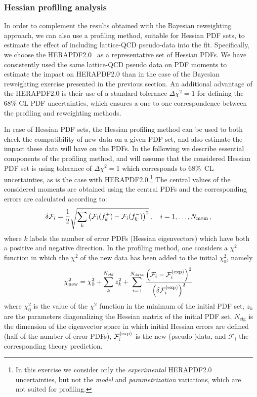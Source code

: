 \subsubsection{Hessian profiling analysis}
\label{sec:hessianprofiling}

In order to complement the results obtained
with the Bayesian reweighting approach,
we can also use a profiling method, suitable
for Hessian PDF sets, to estimate the effect of including
lattice-QCD pseudo-data into the fit. 
%
Specifically, we
choose the HERAPDF2.0~\cite{Abramowicz:2015mha}
as a representative set of Hessian PDFs.
%
We have consistently used the same lattice-QCD
pseudo data on PDF moments to estimate the impact
on HERAPDF2.0 than in the case of the Bayesian reweighting
exercise presented in the previous section.
%
An additional advantage of the HERAPDF2.0 is
their use
of a standard tolerance
$\Delta\chi^2=1$ for defining the 68\% CL PDF
uncertainties, which ensures a
one to one correspondence between
the profiling and reweighting methods.

In case of Hessian PDF sets, the Hessian profiling method
can be used to both check the compatibility of new data on a given PDF set,
and also  estimate the impact these data will have on the PDFs. 
In the following we describe essential components of the profiling method, 
and will assume  that the considered Hessian PDF set is using tolerance of $\Delta\chi^2=1$ 
which corresponds to 68\%~CL uncertainties,
as is the case with HERAPDF2.0.\footnote{In this exercise
we consider only the {\it experimental} HERAPDF2.0
uncertainties, but not the {\it model} and {\it parametrization}
variations, which are not suited for profiling.}
%
The central values of the considered moments are obtained using the central PDFs and the corresponding
errors are calculated according to:
\begin{equation}
\delta\mathcal{F}_i = \frac{1}{2} \sqrt{\sum_{k}\left(\mathcal{F}_i(f_k^+)-\mathcal{F}_i(f_k^-)\right)^2}\, ,
\quad i=1,\ldots,N_{\rm mom} \, ,
\end{equation}
where $k$ labels the number of error PDFs (Hessian eigenvectors)
which have both a positive and negative direction.
%
In the profiling method, one considers a $\chi^2$ function in which the $\chi^2$ of the new
data has been added to the initial $\chi^2_0$, namely
\begin{equation}
\label{eq:newchi2}
\chi^2_{\text{new}} = \chi_0^2 + \sum_{k}^{N_{\text{eig}}} z_k^2
                    + \sum_{i=1}^{N_{\text{data}}}
                      \frac{\lp \mathcal{F}_i - \mathcal{F}_i^{\rm(exp)}\rp^2}
                           {\lp\delta\mathcal{F}_i^{\rm(exp)}\rp^2}
\end{equation}
where $\chi^2_0$ is the value of the $\chi^2$ function in the minimum of the initial PDF set,
$z_k$ are the parameters diagonalizing the Hessian matrix of the initial PDF set,
$N_{\text{eig}}$ is the dimension of the eigenvector space in which initial Hessian errors are defined
(half of the number of error PDFs), $\mathcal{F}_i^{\rm(exp)}$ is the new
(pseudo-)data,
and $\mathcal{F}_i$ the corresponding theory prediction.

